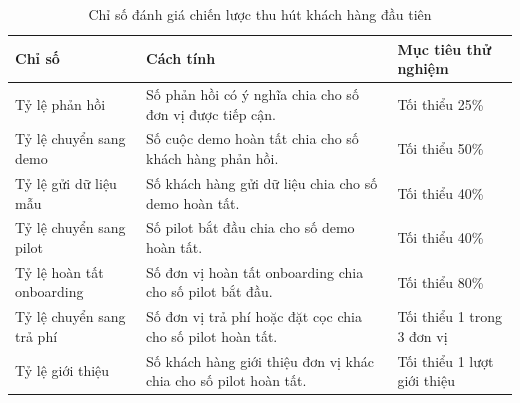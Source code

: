 \begin{table}[htbp]
    \centering
    \caption{Chỉ số đánh giá chiến lược thu hút khách hàng đầu tiên}
    \label{tab:first-customer-acquisition-kpis}
    \begin{tabular}{
        p{}
        p{}
        p{}
    }
        \hline
        \textbf{Chỉ số}
        & \textbf{Cách tính}
        & \textbf{Mục tiêu thử nghiệm} \\
        \hline

        Tỷ lệ phản hồi
        &
        Số phản hồi có ý nghĩa chia cho số đơn vị được tiếp cận.
        &
        Tối thiểu 25\% \\

        \hline

        Tỷ lệ chuyển sang demo
        &
        Số cuộc demo hoàn tất chia cho số khách hàng phản hồi.
        &
        Tối thiểu 50\% \\

        \hline

        Tỷ lệ gửi dữ liệu mẫu
        &
        Số khách hàng gửi dữ liệu chia cho số demo hoàn tất.
        &
        Tối thiểu 40\% \\

        \hline

        Tỷ lệ chuyển sang pilot
        &
        Số pilot bắt đầu chia cho số demo hoàn tất.
        &
        Tối thiểu 40\% \\

        \hline

        Tỷ lệ hoàn tất onboarding
        &
        Số đơn vị hoàn tất onboarding chia cho số pilot bắt đầu.
        &
        Tối thiểu 80\% \\

        \hline

        Tỷ lệ chuyển sang trả phí
        &
        Số đơn vị trả phí hoặc đặt cọc chia cho số pilot hoàn tất.
        &
        Tối thiểu 1 trong 3 đơn vị \\

        \hline

        Tỷ lệ giới thiệu
        &
        Số khách hàng giới thiệu đơn vị khác chia cho số pilot hoàn tất.
        &
        Tối thiểu 1 lượt giới thiệu \\

        \hline
    \end{tabular}
\end{table}

